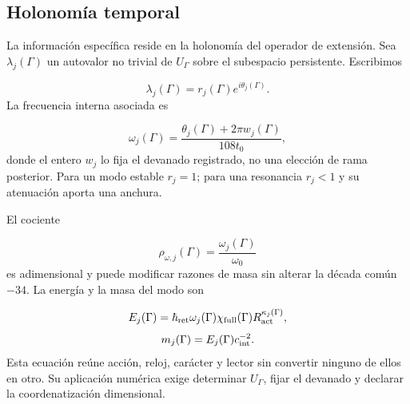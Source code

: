 \subsection{Holonomía temporal}
La información específica reside en la holonomía del operador de extensión. Sea \(\lambda_j(\Gamma)\) un autovalor no trivial de \(U_\Gamma\) sobre el subespacio persistente. Escribimos

\[
 \lambda_j(\Gamma)=r_j(\Gamma)e^{i\theta_j(\Gamma)}.
\]
La frecuencia interna asociada es

\[
 \omega_j(\Gamma)
 =\frac{\theta_j(\Gamma)+2\pi w_j(\Gamma)}{108t_0},
\]
donde el entero \(w_j\) lo fija el devanado registrado, no una elección de rama posterior. Para un modo estable \(r_j=1\); para una resonancia \(r_j<1\) y su atenuación aporta una anchura.

El cociente

\[
 \rho_{\omega,j}(\Gamma)
 =\frac{\omega_j(\Gamma)}{\omega_0}
\]
es adimensional y puede modificar razones de masa sin alterar la década común \(-34\). La energía y la masa del modo son

\[
 E_j(\Gamma)=\hbar_{\rm ret}\omega_j(\Gamma)
 \chi_{\rm full}(\Gamma)R_{\rm act}^{\kappa_j(\Gamma)},
\]
\[
 m_j(\Gamma)=E_j(\Gamma)c_{\rm int}^{-2}.
\]
Esta ecuación reúne acción, reloj, carácter y lector sin convertir ninguno de ellos en otro. Su aplicación numérica exige determinar \(U_\Gamma\), fijar el devanado y declarar la coordenatización dimensional.
